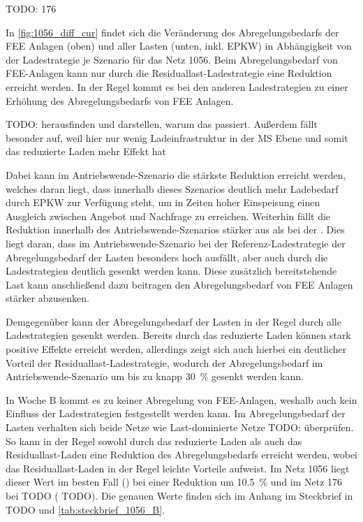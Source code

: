 {\color{red} TODO: 176}



In \autoref{fig:1056_diff_cur} findet sich die Veränderung des Abregelungsbedarfs der \gls{FEE} Anlagen (oben) und aller Lasten (unten, inkl. \gls{EPKW}) in Abhängigkeit von der Ladestrategie je Szenario für das Netz \num{1056}.
Beim Abregelungsbedarf von \gls{FEE}-Anlagen kann nur durch die Residuallast-Ladestrategie eine Reduktion erreicht werden.
In der Regel kommt es bei den anderen Ladestrategien zu einer Erhöhung des Abregelungsbedarfs von \gls{FEE} Anlagen.

{\color{red} TODO: herausfinden und darstellen, warum das passiert. Außerdem \SzeFirmenparkplatz fällt besonder auf, weil hier nur wenig Ladeinfrastruktur in der MS Ebene und somit das reduzierte Laden mehr Effekt hat}

Dabei kann im Antriebswende-Szenario die stärkste Reduktion erreicht werden, welches daran liegt, dass innerhalb dieses Szenarios deutlich mehr Ladebedarf durch \gls{EPKW} zur Verfügung steht, um in Zeiten hoher Einspeisung einen Ausgleich zwischen Angebot und Nachfrage zu erreichen.
Weiterhin fällt die Reduktion innerhalb des Antriebswende-Szenarios stärker aus als bei der \SzeFirmenparkplatzdot.
Dies liegt daran, dass im Antriebswende-Szenario bei der Referenz-Ladestrategie der Abregelungsbedarf der Lasten besonders hoch ausfällt, aber auch durch die Ladestrategien deutlich gesenkt werden kann.
Diese zusätzlich bereitstehende Last kann anschließend dazu beitragen den Abregelungsbedarf von \gls{FEE} Anlagen stärker abzusenken.\medskip

Demgegenüber kann der Abregelungsbedarf der Lasten in der Regel durch alle Ladestrategien gesenkt werden.
Bereits durch das reduzierte Laden können stark positive Effekte erreicht werden, allerdings zeigt sich auch hierbei ein deutlicher Vorteil der Residuallast-Ladestrategie, wodurch der Abregelungsbedarf im Antriebswende-Szenario um bis zu knapp \SI{30}{\percent} gesenkt werden kann.\medskip

In Woche B kommt es zu keiner Abregelung von \gls{FEE}-Anlagen, weshalb auch kein Einfluss der Ladestrategien festgestellt werden kann.
Im Abregelungsbedarf der Lasten verhalten sich beide Netze wie Last-dominierte Netze {\color{red} TODO: überprüfen}.
So kann in der Regel sowohl durch das reduzierte Laden als auch das Residuallast-Laden eine Reduktion des Abregelungsbedarfs erreicht werden, wobei das Residuallast-Laden in der Regel leichte Vorteile aufweist.
Im Netz \num{1056} liegt dieser Wert im besten Fall (\SzeFirmenparkplatzdot) bei einer Reduktion um \SI{10.5}{\percent} und im Netz \num{176} bei {\color{red} TODO} ({\color{red} TODO}).
Die genauen Werte finden sich im Anhang im Steckbrief in {\color{red} TODO} und \autoref{tab:steckbrief_1056_B}.\medskip

